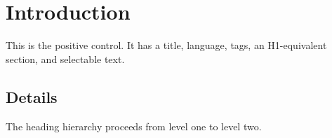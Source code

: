 \documentclass[11pt]{article}
\begin{document}
\section{Introduction}
This is the positive control. It has a title, language, tags, an H1-equivalent section, and selectable text.
\subsection{Details}
The heading hierarchy proceeds from level one to level two.
\end{document}
